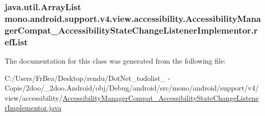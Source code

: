 \hypertarget{classmono_1_1android_1_1support_1_1v4_1_1view_1_1accessibility_1_1_accessibility_manager_compat_18265d54b1862e339153b0dd9ae68d99_3baa2427af2406275039d08f5a097d0d}{
\subsubsection[{refList}]{\setlength{\rightskip}{0pt plus 5cm}java.util.ArrayList {\bf mono.android.support.v4.view.accessibility.AccessibilityManagerCompat\_\-AccessibilityStateChangeListenerImplementor.refList}}}
\label{classmono_1_1android_1_1support_1_1v4_1_1view_1_1accessibility_1_1_accessibility_manager_compat_18265d54b1862e339153b0dd9ae68d99_3baa2427af2406275039d08f5a097d0d}




The documentation for this class was generated from the following file:\begin{CompactItemize}
\item 
C:/Users/FrBea/Desktop/rendu/DotNet\_\-todolist\_ - Copie/2doo/\_\-2doo.Android/obj/Debug/android/src/mono/android/support/v4/view/accessibility/\hyperlink{_accessibility_manager_compat___accessibility_state_change_listener_implementor_8java}{AccessibilityManagerCompat\_\-AccessibilityStateChangeListenerImplementor.java}\end{CompactItemize}
